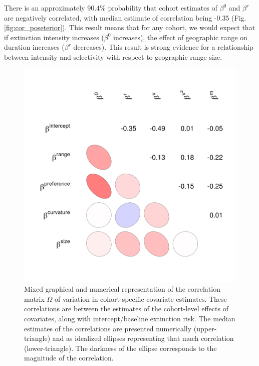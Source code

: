 \documentclass[11pt]{article}
\begin{document}
There is an approximately 90.4\% probability that cohort estimates of \(\beta^{0}\) and \(\beta^{r}\) are negatively correlated, with median estimate of correlation being -0.35 (Fig. \ref{fig:cor_poseterior}). This result means that for any cohort, we would expect that if extinction intensity increases (\(\beta^{0}\) increases), the effect of geographic range on duration increases (\(\beta^{r}\) decreases). This result is strong evidence for a relationship between intensity and selectivity with respect to geographic range size.

\begin{figure}[ht]
  \centering
  \includegraphics[height = 0.7\textheight,width=\textwidth,keepaspectratio=true]{figure/wei_cor_heatmap_cweib_cens}
  \caption{Mixed graphical and numerical representation of the correlation matrix \(\Omega\) of variation in cohort-specific covariate estimates. These correlations are between the estimates of the cohort-level effects of covariates, along with intercept/baseline extinction risk. The median estimates of the correlations are presented numerically (upper-triangle) and as idealized ellipses representing that much correlation (lower-triangle). The darkness of the ellipse corresponds to the magnitude of the correlation.}
  \label{fig:cor_posterior}
\end{figure}
\end{document}
